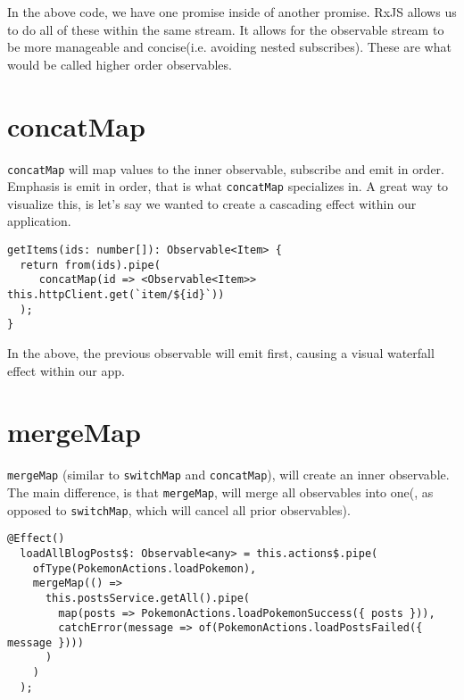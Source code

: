 In the above code, we have one promise inside of another promise. RxJS allows us
to do all of these within the same stream. It allows for the observable stream
to be more manageable and concise(i.e. avoiding nested subscribes). These are
what would be called higher order observables. 

\section{concatMap}
\lstinline{concatMap} will map values to the inner observable, subscribe and 
emit in order. Emphasis is emit in order, that is what \lstinline{concatMap} 
specializes in. A great way to visualize this, is let's say we wanted to 
create a cascading effect within our application. 

\begin{lstlisting}[caption=data-table.component.ts]
getItems(ids: number[]): Observable<Item> {
  return from(ids).pipe(
     concatMap(id => <Observable<Item>> this.httpClient.get(`item/${id}`))
  );
}
\end{lstlisting}

In the above, the previous observable will emit first, causing a visual 
waterfall effect within our app. 

\section{mergeMap}
\lstinline{mergeMap} (similar to \lstinline{switchMap} and \lstinline{concatMap}),
will create an inner observable. The main difference, is that \lstinline{mergeMap},
will merge all observables into one(, as opposed to \lstinline{switchMap}, 
which will cancel all prior observables).

\begin{lstlisting}[caption=mergeMap example]
  @Effect()
  loadAllBlogPosts$: Observable<any> = this.actions$.pipe(
    ofType(PokemonActions.loadPokemon),
    mergeMap(() =>
      this.postsService.getAll().pipe(
        map(posts => PokemonActions.loadPokemonSuccess({ posts })),
        catchError(message => of(PokemonActions.loadPostsFailed({ message })))
      )
    )
  );  
\end{lstlisting}

